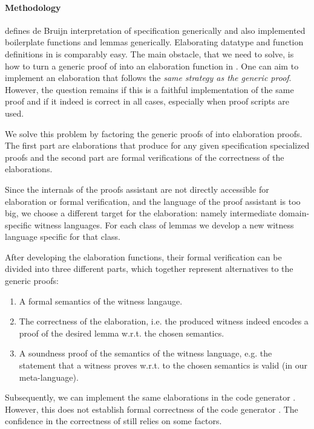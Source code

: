 \paragraph{Methodology}
\Loom defines de Bruijn interpretation of \Knot specification generically and
also implemented boilerplate functions and lemmas generically. Elaborating
datatype and function definitions in \Needle is comparably easy. The main
obstacle, that we need to solve, is how to turn a generic proof of \Loom into an
elaboration function in \Needle. One can aim to implement an elaboration that
follows the \emph{same strategy as the generic proof}. However, the question
remains if this is a faithful implementation of the same proof and if it indeed
is correct in all cases, especially when proof scripts are used.

We solve this problem by factoring the generic proofs of \Loom into elaboration
proofs. The first part are elaborations that produce for any given specification
specialized proofs and the second part are formal verifications of the
correctness of the elaborations.

Since the internals of the proofs assistant are not directly accessible for
elaboration or formal verification, and the language of the proof assistant is
too big, we choose a different target for the elaboration: namely intermediate
domain-specific witness languages. For each class of lemmas we develop a new
witness language specific for that class.

After developing the elaboration functions, their formal verification can be
divided into three different parts, which together represent alternatives to the
generic proofs:
\begin{enumerate}
\item A formal semantics of the witness langauge.
\item The correctness of the elaboration, i.e. the produced witness indeed
  encodes a proof of the desired lemma w.r.t. the chosen semantics.
\item A soundness proof of the semantics of the witness language, e.g. the
  statement that a witness proves w.r.t. to the chosen semantics is valid (in
  our meta-language).
\end{enumerate}

Subsequently, we can implement the same elaborations in the code generator
\Needle. However, this does not establish formal correctness of the code
generator \Needle. The confidence in the correctness of \Needle still relies on
some factors.

